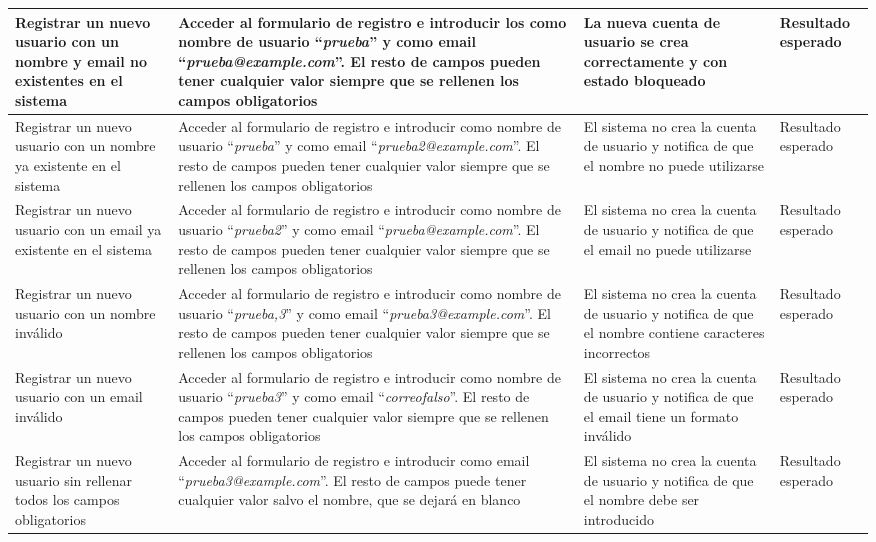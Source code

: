 \begin{landscape}
\begin{longtable}[c]{|p{50mm}|p{50mm}|p{50mm}|p{50mm}|}
	Registrar un nuevo usuario con un nombre y email no existentes en el sistema & Acceder al formulario de registro e introducir los como nombre de usuario ``\textit{prueba}'' y como email ``\textit{prueba@example.com}''.  El resto de campos pueden tener cualquier valor siempre que se rellenen los campos obligatorios & La nueva cuenta de usuario se crea correctamente y con estado bloqueado & Resultado esperado\\
	\hline
	Registrar un nuevo usuario con un nombre ya existente en el sistema & Acceder al formulario de registro e introducir como nombre de usuario ``\textit{prueba}'' y como email ``\textit{prueba2@example.com}''.  El resto de campos pueden tener cualquier valor siempre que se rellenen los campos obligatorios & El sistema no crea la cuenta de usuario y notifica de que el nombre no puede utilizarse & Resultado esperado\\
	\hline
	Registrar un nuevo usuario con un email ya existente en el sistema & Acceder al formulario de registro e introducir como nombre de usuario ``\textit{prueba2}'' y como email ``\textit{prueba@example.com}''.  El resto de campos pueden tener cualquier valor siempre que se rellenen los campos obligatorios & El sistema no crea la cuenta de usuario y notifica de que el email no puede utilizarse & Resultado esperado\\
	\hline
	Registrar un nuevo usuario con un nombre inválido & Acceder al formulario de registro e introducir como nombre de usuario ``\textit{prueba,3}'' y como email ``\textit{prueba3@example.com}''.  El resto de campos pueden tener cualquier valor siempre que se rellenen los campos obligatorios & El sistema no crea la cuenta de usuario y notifica de que el nombre contiene caracteres incorrectos & Resultado esperado\\
	\hline
	Registrar un nuevo usuario con un email inválido & Acceder al formulario de registro e introducir como nombre de usuario ``\textit{prueba3}'' y como email ``\textit{correofalso}''.  El resto de campos pueden tener cualquier valor siempre que se rellenen los campos obligatorios & El sistema no crea la cuenta de usuario y notifica de que el email tiene un formato inválido & Resultado esperado\\
	\hline
	Registrar un nuevo usuario sin rellenar todos los campos obligatorios & Acceder al formulario de registro e introducir como email ``\textit{prueba3@example.com}''. El resto de campos puede tener cualquier valor salvo el nombre, que se dejará en blanco & El sistema no crea la cuenta de usuario y notifica de que el nombre debe ser introducido & Resultado esperado\\

\end{longtable}
\end{landscape}
